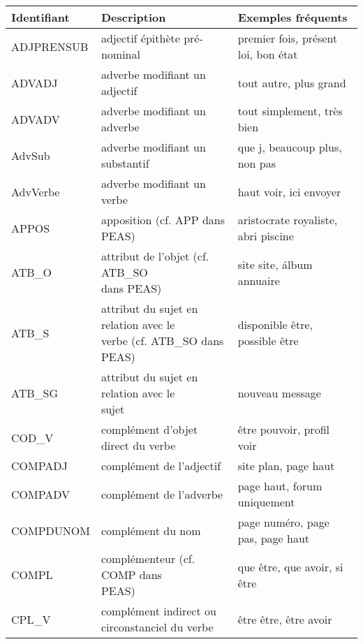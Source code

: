 \documentclass[oneside,parskip,draft]{scrbook}
\makeatletter
\newcommand{\specialcell}[2][l]{%
      \begin{tabular}[#1]{@{}l@{}}#2\end{tabular}}
\makeatother
\begin{document}
\begin{longtable}{lll}
    \toprule
    Identifiant   & Description & Exemples fréquents \\ \midrule
    ADJPRENSUB    &  adjectif épithète pré-nominal         & premier fois, présent loi, bon état \\ \midrule
    ADVADJ        &  adverbe modifiant un adjectif         & tout autre, plus grand \\ \midrule
    ADVADV        &  adverbe modifiant un adverbe          & tout simplement, très bien \\ \midrule
    AdvSub        &  adverbe modifiant un substantif       & que j, beaucoup plus, non pas \\ \midrule
    AdvVerbe      &  adverbe modifiant un verbe            & haut voir, ici envoyer \\ \midrule
    APPOS         &  apposition (cf. APP dans PEAS)        & aristocrate royaliste, abri piscine \\ \midrule
    ATB\_O        &  \specialcell{attribut de l'objet (cf. ATB\_SO \\ dans PEAS)} & site site, álbum annuaire \\ \midrule
    ATB\_S        &  \specialcell{attribut du sujet en relation avec le \\ verbe (cf. ATB\_SO dans PEAS)} & disponible être, possible être \\ \midrule
    ATB\_SG       &  \specialcell{attribut du sujet en relation avec le \\ sujet} & nouveau message \\ \midrule
    COD\_V        &  complément d'objet direct du verbe    & être pouvoir,  profil voir \\ \midrule
    COMPADJ       &  complément de l'adjectif              & site plan, page haut \\ \midrule
    COMPADV       &  complément de l'adverbe               & page haut, forum uniquement \\ \midrule
    COMPDUNOM     &  complément du nom                     & page numéro, page pas, page haut \\ \midrule
    COMPL         &  \specialcell{complémenteur (cf. COMP dans \\ PEAS)} & que être, que avoir, si être \\ \midrule
    CPL\_V        &  \specialcell{complément indirect ou \\ circonstanciel du verbe } & être être, être avoir  \\ \midrule

\end{longtable}
\end{document}

